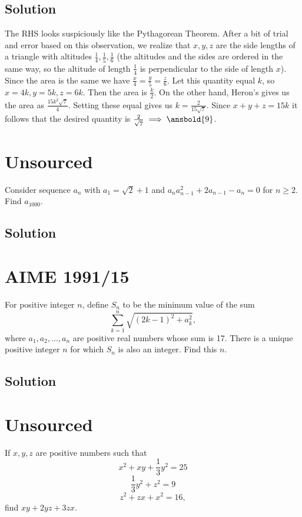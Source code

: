 \documentclass{article}
\begin{document}
\subsection{Solution}
The RHS looks suspiciously like the Pythagorean Theorem. After a bit of trial and error based on this observation, we realize that $x,y,z$ are the side lengths of a triangle with altitudes $\frac{1}{4},\frac{1}{5},\frac{1}{6}$ (the altitudes and the sides are ordered in the same way, so the altitude of length $\frac{1}{4}$ is perpendicular to the side of length $x$). Since the area is the same we have $\frac{x}{4}=\frac{y}{5}=\frac{z}{6}$. Let this quantity equal $k$, so $x=4k,y=5k,z=6k$. Then the area is $\frac{k}{2}$. On the other hand, Heron's gives us the area as $\frac{15k^2\sqrt{7}}{4}$. Setting these equal gives us $k=\frac{2}{15\sqrt{7}}$. Since $x+y+z=15k$ it follows that the desired quantity is $\frac{2}{\sqrt{7}} \implies \ansbold{9}$.

\pagebreak\section{Unsourced}
Consider sequence $a_n$ with $a_1=\sqrt{2}+1$ and $a_na_{n-1}^2+2a_{n-1}-a_n=0$ for $n\geq 2.$ Find $a_{1000}.$

\subsection{Solution}

\pagebreak\section{AIME 1991/15}
For positive integer $n$, define $S_n$ to be the minimum value of the sum\[ \sum_{k=1}^n \sqrt{(2k-1)^2+a_k^2}, \]where $a_1,a_2,\ldots,a_n$ are positive real numbers whose sum is 17. There is a unique positive integer $n$ for which $S_n$ is also an integer. Find this $n$.

\subsection{Solution}

\pagebreak\section{Unsourced}
If $x,y,z$ are positive numbers such that
    \[x^2+xy+\frac{1}{3}y^2=25\]
    \[\frac{1}{3}y^2+z^2=9\]
    \[z^2+zx+x^2=16,\]
    find $xy+2yz+3zx.$
\end{document}
